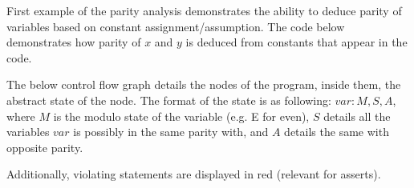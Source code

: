 First example of the parity analysis demonstrates the ability to deduce
parity of variables based on constant assignment/assumption.  The code
below demonstrates how parity of $x$ and $y$ is deduced from constants
that appear in the code.

The below control flow graph details the nodes of the program, inside
them, the abstract state of the node. The format of the state is as
following: $var: M, S, A$, where $M$ is the modulo state of the variable
(e.g. E for even), $S$ details all the variables $var$ is possibly in
the same parity with, and $A$ details the same with opposite parity.

Additionally, violating statements are displayed in red (relevant for
asserts).
